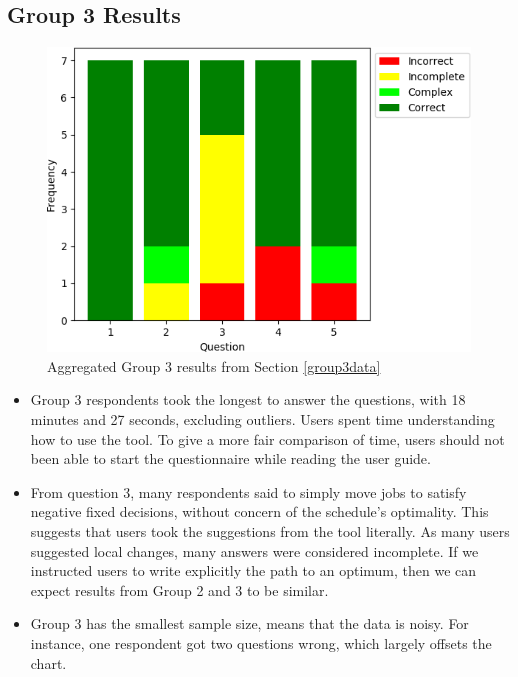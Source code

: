 \subsection{Group 3 Results}

\begin{figure}[H]
	\begin{center}
		\includegraphics[scale=0.55]{figures/questionnaire_results_group_three}
	\end{center}
	\caption{Aggregated Group 3 results from Section \ref{group3data}}
	\label{group3chart}
\end{figure}

\begin{itemize}
	\item Group 3 respondents took the longest to answer the questions, with 18 minutes and 27 seconds, excluding outliers. Users spent time understanding how to use the tool. To give a more fair comparison of time, users should not been able to start the questionnaire while reading the user guide.
	\item From question 3, many respondents said to simply move jobs to satisfy negative fixed decisions, without concern of the schedule's optimality. This suggests that users took the suggestions from the tool literally. As many users suggested local changes, many answers were considered incomplete. If we instructed users to write explicitly the path to an optimum, then we can expect results from Group 2 and 3 to be similar.
	\item Group 3 has the smallest sample size, means that the data is noisy. For instance, one respondent got two questions wrong, which largely offsets the chart.
\end{itemize}

